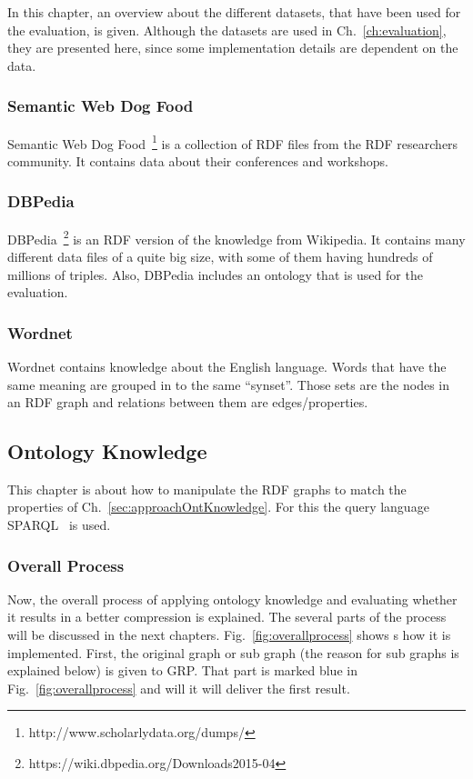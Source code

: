 In this chapter, an overview about the different datasets, that have been used for the evaluation, is given. Although the datasets are used in Ch.~\ref{ch:evaluation}, they are presented here, since some implementation details are dependent on the data.

\subsubsection{Semantic Web Dog Food}

Semantic Web Dog Food~\footnote{http://www.scholarlydata.org/dumps/} is a collection of RDF files from the RDF researchers community. It contains data about their conferences and workshops.

\subsubsection{DBPedia}

DBPedia~\footnote{https://wiki.dbpedia.org/Downloads2015-04} is an RDF version of the knowledge from Wikipedia. It contains many different data files of a quite big size, with some of them having hundreds of millions of triples. Also, DBPedia includes an ontology that is used for the evaluation.

\subsubsection{Wordnet}

Wordnet contains knowledge about the English language. Words that have the same meaning are grouped in to the same \enquote{synset}. Those sets are the nodes in an RDF graph and relations between them are edges/properties.

\subsection{Ontology Knowledge}\label{sec:implementationOntKnowledge}



This chapter is about how to manipulate the RDF graphs to match the properties of Ch.~\ref{sec:approachOntKnowledge}. For this the query language SPARQL~\cite{sparql} is used.


\subsubsection{Overall Process}
Now, the overall process of applying ontology knowledge and evaluating whether it results in a better compression is explained. The several parts of the process will be discussed in the next chapters. Fig.~\ref{fig:overallprocess} shows s how it is implemented. First, the original graph or sub graph (the reason for sub graphs is explained below) is given to GRP. That part is marked blue in Fig.~\ref{fig:overallprocess} and will it will deliver the first result.

